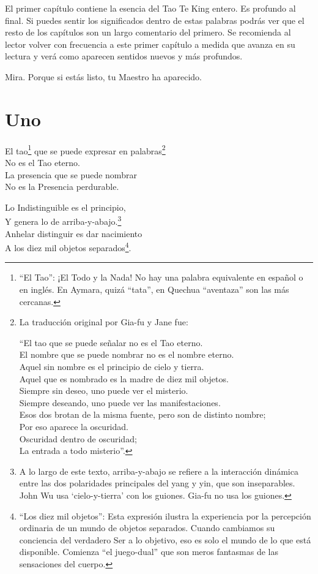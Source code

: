 \documentclass[book,b5paper,hidelinks,final]{memoir}
\begin{document}
	El primer capítulo contiene la esencia del Tao Te King entero. Es
	profundo al final. Si puedes sentir los significados dentro de estas
	palabras podrás ver que el resto de los capítulos son un largo
	comentario del primero. Se recomienda al lector volver con frecuencia a
	este primer capítulo a medida que avanza en su lectura y verá como
	aparecen sentidos nuevos y más profundos.
	
	Mira. Porque si estás listo, tu Maestro ha aparecido.
	
	\chapter*{Uno}
	
	El tao\footnote{``El Tao'': ¡El Todo y la Nada! No hay una palabra equivalente en
		español o en inglés. En Aymara, quizá ``tata'', en Quechua ``aventaza''
		son las más cercanas.} que se puede expresar en palabras\footnote{La traducción original por Gia-fu y Jane fue:
		
		``El tao que se puede señalar no es el Tao eterno.\\
		El nombre que se puede nombrar no es el nombre eterno.\\
		Aquel sin nombre es el principio de cielo y tierra.\\
		Aquel que es nombrado es la madre de diez mil objetos.\\
		Siempre sin deseo, uno puede ver el misterio.\\
		Siempre deseando, uno puede ver las manifestaciones.\\
		Esos dos brotan de la misma fuente, pero son de distinto nombre;\\
		Por eso aparece la oscuridad.\\
		Oscuridad dentro de oscuridad;\\
		La entrada a todo misterio''.}\\
	No es el Tao eterno.\\
	La presencia que se puede nombrar\\
	No es la Presencia perdurable.
	
	Lo Indistinguible es el principio,\\
	Y genera lo de arriba-y-abajo.\footnote{A lo largo de este texto, arriba-y-abajo se refiere a la interacción dinámica entre las dos polaridades principales del yang y yin, que son inseparables. John Wu usa `cielo-y-tierra' con los guiones. Gia-fu no usa los guiones.}\\
	Anhelar distinguir es dar nacimiento\\
	A los diez mil objetos separados\footnote{``Los diez mil objetos'': Esta expresión ilustra la experiencia por la
		percepción ordinaria de un mundo de objetos separados. Cuando cambiamos
		su conciencia del verdadero Ser a lo objetivo, eso es solo el mundo de
		lo que está disponible. Comienza ``el juego-dual'' que son meros
		fantasmas de las sensaciones del cuerpo.}.
	
\end{document}
